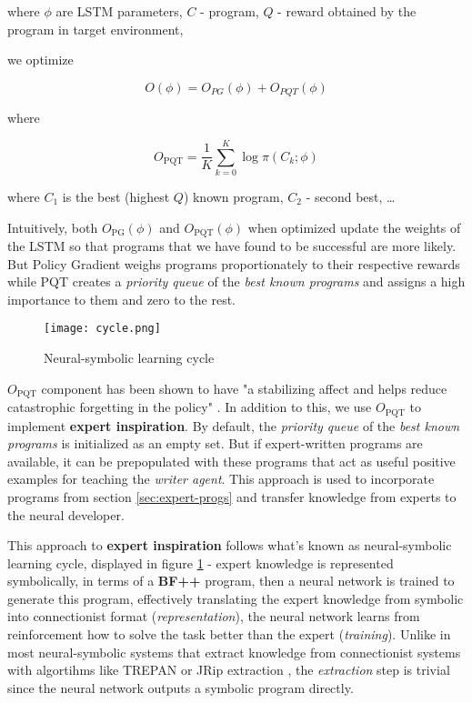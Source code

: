 where $\phi$ are LSTM parameters, $C$ - program, $Q$ - reward obtained by the program in target environment,

we optimize

\begin{equation}
    O(\phi)=O_{PG}(\phi)+O_{PQT}(\phi)
\end{equation}

where

\begin{equation}
    O_{\text{PQT}} = \frac{1}{K} \sum_{k=0}^K \log \pi(C_k; \phi)
\end{equation}

where $C_1$ is the best (highest $Q$) known program, $C_2$ - second best, \dots

Intuitively, both $O_{\text{PG}}(\phi)$ and $O_{\text{PQT}}(\phi)$ when optimized update the weights of the LSTM so that programs that we have found to be successful are more likely.
But Policy Gradient weighs programs proportionately to their respective rewards while PQT creates a \textit{priority queue} of the \textit{best known programs} and assigns a high importance to them and zero to the rest.

\begin{figure}
    \centering
    \texttt{[image: cycle.png]}
    \caption{Neural-symbolic learning cycle \cite{cycle}}
    \label{fig:cycle}
\end{figure}

$O_{\text{PQT}}$ component has been shown to have "a stabilizing affect and helps reduce catastrophic forgetting in the policy" \cite{brain-coder}.
In addition to this, we use $O_{\text{PQT}}$ to implement \textbf{expert inspiration}.
By default, the \textit{priority queue} of the \textit{best known programs} is initialized as an empty set.
But if expert-written programs are available, it can be prepopulated with these programs that act as useful positive examples for teaching the \emph{writer agent}.
This approach is used to incorporate programs from section \ref{sec:expert-progs} and transfer knowledge from experts to the neural developer.

This approach to \textbf{expert inspiration} follows what's known as neural-symbolic learning cycle, displayed in figure \ref{fig:cycle} - expert knowledge is represented symbolically, in terms of a \textbf{BF++} program, then a neural network is trained to generate this program, effectively translating the expert knowledge from symbolic into connectionist format (\emph{representation}), the neural network learns from reinforcement how to solve the task better than the expert (\emph{training}).
Unlike in most neural-symbolic systems \cite{neuralsymbolic} that extract knowledge from connectionist systems with algortihms like TREPAN \cite{trepan} or JRip extraction \cite{jripextr}, the \emph{extraction} step is trivial since the neural network outputs a symbolic program directly.

